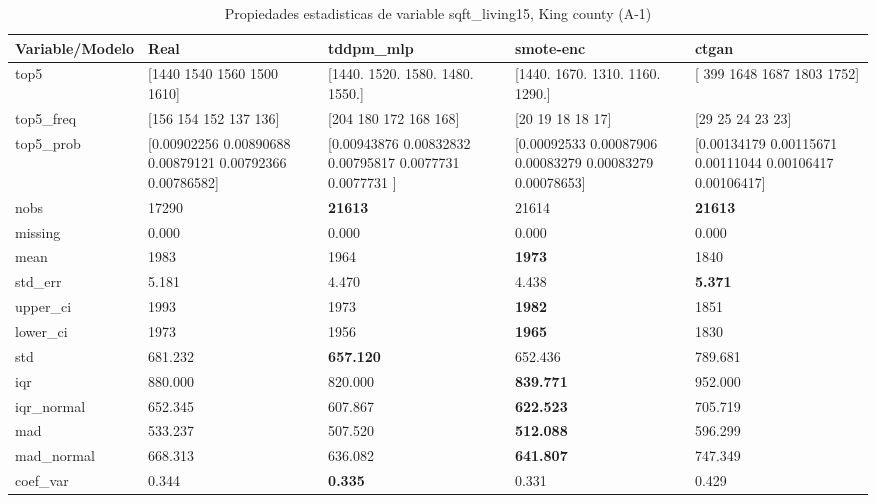 \begin{table}[H]
\centering
\fontsize{8}{14}\selectfont
\caption{Propiedades  estadisticas de variable sqft\_living15, King county (A-1)}
\label{table-stats-king county-a-1-sqft_living15}
\begin{tabular}{|l|m{10em}|m{10em}|m{10em}|m{10em}|}
\hline
 \rowcolor[gray]{0.8}
Variable/Modelo & Real & tddpm\_mlp & smote-enc & ctgan \\
\hline top5 & [1440 1540 1560 1500 1610] & [1440. 1520. 1580. 1480. 1550.] & [1440. 1670. 1310. 1160. 1290.] & [ 399 1648 1687 1803 1752] \\
\hline top5\_freq & [156 154 152 137 136] & [204 180 172 168 168] & [20 19 18 18 17] & [29 25 24 23 23] \\
\hline top5\_prob & [0.00902256 0.00890688 0.00879121 0.00792366 0.00786582] & [0.00943876 0.00832832 0.00795817 0.0077731  0.0077731 ] & [0.00092533 0.00087906 0.00083279 0.00083279 0.00078653] & [0.00134179 0.00115671 0.00111044 0.00106417 0.00106417] \\
\hline nobs & 17290 & \bfseries 21613 & \cellcolor[rgb]{0.9, 0.54, 0.52} 21614 & \bfseries 21613 \\
\hline missing & 0.000 & 0.000 & 0.000 & 0.000 \\
\hline mean & 1983 & 1964 & \bfseries 1973 & \cellcolor[rgb]{0.9, 0.54, 0.52} 1840 \\
\hline std\_err & 5.181 & 4.470 & \cellcolor[rgb]{0.9, 0.54, 0.52} 4.438 & \bfseries 5.371 \\
\hline upper\_ci & 1993 & 1973 & \bfseries 1982 & \cellcolor[rgb]{0.9, 0.54, 0.52} 1851 \\
\hline lower\_ci & 1973 & 1956 & \bfseries 1965 & \cellcolor[rgb]{0.9, 0.54, 0.52} 1830 \\
\hline std & 681.232 & \bfseries 657.120 & 652.436 & \cellcolor[rgb]{0.9, 0.54, 0.52} 789.681 \\
\hline iqr & 880.000 & 820.000 & \bfseries 839.771 & \cellcolor[rgb]{0.9, 0.54, 0.52} 952.000 \\
\hline iqr\_normal & 652.345 & 607.867 & \bfseries 622.523 & \cellcolor[rgb]{0.9, 0.54, 0.52} 705.719 \\
\hline mad & 533.237 & 507.520 & \bfseries 512.088 & \cellcolor[rgb]{0.9, 0.54, 0.52} 596.299 \\
\hline mad\_normal & 668.313 & 636.082 & \bfseries 641.807 & \cellcolor[rgb]{0.9, 0.54, 0.52} 747.349 \\
\hline coef\_var & 0.344 & \bfseries 0.335 & 0.331 & \cellcolor[rgb]{0.9, 0.54, 0.52} 0.429 \\

\end{tabular}
\end{table}
